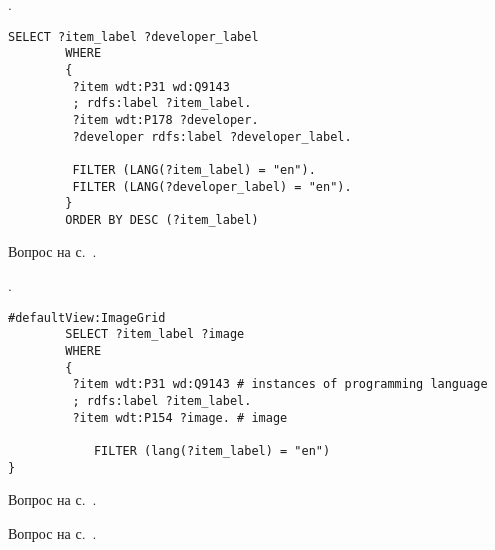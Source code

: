 
\begin{task}
    \label{answer:prog_langs_1}
    . 
	\begin{lstlisting}[language=SPARQL, caption={{Создатели языков программирования}\protect\footnotemark}, label=lst:prog_lang_answer_1]
		SELECT ?item_label ?developer_label
		WHERE
		{
		 ?item wdt:P31 wd:Q9143
		 ; rdfs:label ?item_label. 
		 ?item wdt:P178 ?developer.
		 ?developer rdfs:label ?developer_label.
		 
		 FILTER (LANG(?item_label) = "en"). 
		 FILTER (LANG(?developer_label) = "en"). 
		}
		ORDER BY DESC (?item_label)
	\end{lstlisting}
    
    \small{Вопрос на с.~\pageref{prog_lang_questions}.}
\end{task}

\begin{task}
    \label{answer:prog_langs_2}
    . 
	\begin{lstlisting}[language=SPARQL, caption={{Логотипы языков программирования}\protect\footnotemark}, label=lst:prog_lang_answer_1]
		#defaultView:ImageGrid
		SELECT ?item_label ?image
		WHERE
		{
		 ?item wdt:P31 wd:Q9143 # instances of programming language
		 ; rdfs:label ?item_label. 
		 ?item wdt:P154 ?image. # image
		 	
		 	FILTER (lang(?item_label) = "en")
}
	\end{lstlisting}
    
    \small{Вопрос на с.~\pageref{prog_lang_questions}.}
\end{task}

\begin{task}
    \label{answer:prog_langs_3}
    \small{Вопрос на с.~\pageref{prog_lang_questions}}.
\end{task}

